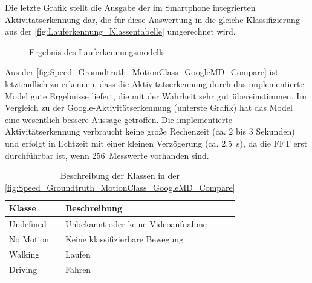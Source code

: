 Die letzte Grafik stellt die Ausgabe der im Smartphone integrierten Aktivitäts\-erkenn\-ung dar, die für diese Auswertung in die gleiche Klassifizierung aus der \autoref{fig:Lauferkennung_Klassentabelle} umgerechnet wird.
	\begin{figure}[htpb]
		\centering
		\caption{Ergebnis des Lauferkennungsmodells}
		\label{fig:Speed_Groundtruth_MotionClass_GoogleMD_Compare}
	\end{figure}


Aus der \autoref{fig:Speed_Groundtruth_MotionClass_GoogleMD_Compare} ist letztendlich zu erkennen, dass die Aktivitäts\-erkenn\-ung durch das implementierte Model gute Ergebnisse liefert, die mit der Wahrheit sehr gut übereinstimmen. Im Vergleich zu der Google-Aktivitäts\-erkenn\-ung (unterste Grafik) hat das Model eine wesentlich bessere Aussage getroffen. Die implementierte Aktivitätserkennung verbraucht keine große Rechenzeit (ca. $2$ bis $3$ Sekunden) und erfolgt in Echtzeit mit einer kleinen Verzögerung (ca. \SI{2,5}{\second}), da die FFT erst durchführbar ist, wenn \SI{256}{Messwerte} vorhanden sind.

\begin{table}[htpb]
	\caption{Beschreibung der Klassen in der \autoref{fig:Speed_Groundtruth_MotionClass_GoogleMD_Compare}}
	\label{fig:Lauferkennung_Klassentabelle}
	\centering
	\begin{tabular}{|l|l|}
		\hline
		\textbf{Klasse} & \textbf{Beschreibung}\\
		\hline
		Undefined & Unbekannt oder keine Videoaufnahme\\ 
		\hline
		No Motion &  Keine klassifizierbare Bewegung\\ 
		\hline
		Walking & Laufen\\ 
		\hline
		Driving & Fahren\\ 
		\hline
	\end{tabular}
\end{table}

